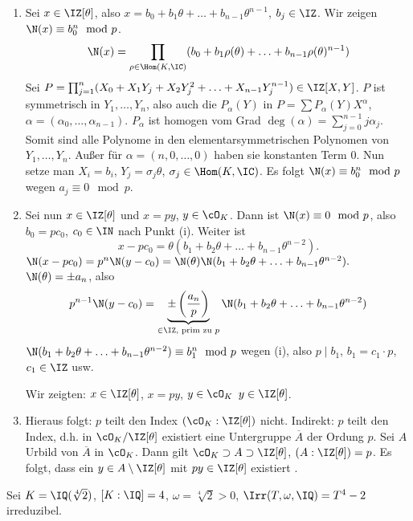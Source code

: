 \begin{Beweis}
 \begin{enumerate}
  \item Sei $x\in\IZ[\theta]$, also $x=b_0+b_1\theta+\ldots+b_{n-1}\theta^{n-1}$, $b_j\in\IZ$. Wir zeigen $\N(x)\equiv b_0^n \mod{p}$.
  \[ \N(x)=\prod_{\rho\in\Hom(K,\IC)} (b_0+b_1\rho(\theta)+\ldots+b_{n-1}\rho(\theta)^{n-1})\]
Sei $P=\prod_{j=1}^n(X_0+X_1Y_j+X_2Y_j^2+\ldots+X_{n-1}Y_j^{n-1})\in\IZ[X,Y]$. $P$ ist symmetrisch in $Y_1,\ldots,Y_n$, also auch die $P_{\alpha}(Y)$ in $P=\sum P_\alpha(Y)X^\alpha$, $\alpha=(\alpha_0,\ldots,\alpha_{n-1})$. $P_\alpha$ ist homogen vom Grad $\deg(\alpha)=\sum_{j=0}^{n-1}j\alpha_j$. Somit sind alle Polynome in den elementarsymmetrischen Polynomen von $Y_1,\ldots,Y_n$. Außer für $\alpha=(n,0,\ldots,0)$ haben sie konstanten Term $0$. Nun setze man $X_i=b_i$, $Y_j=\sigma_j\theta$, $\sigma_j\in\Hom(K,\IC)$. Es folgt $\N(x)\equiv b_0^n \mod{p}$ wegen $a_j\equiv 0\mod{p}$.
\item Sei nun $x\in\IZ[\theta]$ und $x=py$, $y\in\cO_K$. Dann ist $\N(x)\equiv 0\mod{p}$, also $b_0=pc_0$, $c_0\in\IN$ nach Punkt (i). Weiter ist
\[x-pc_0=\theta(b_1+b_2\theta+\ldots+b_{n-1}\theta^{n-2}). \]
\folge $\N(x-pc_0)=p^n\N(y-c_0)=\N(\theta)\N(b_1+b_2\theta+\ldots+b_{n-1}\theta^{n-2}).$ $\N(\theta)=\pm a_n$, also
\[ p^{n-1} \N(y-c_0)=\underbrace{\pm \left( \frac{a_n}{p}\right)}_{\in\IZ,\text{ prim zu } p}\N(b_1+b_2\theta+\ldots+b_{n-1}\theta^{n-2})\]
$\N(b_1+b_2\theta+\ldots+b_{n-1}\theta^{n-2})\equiv b_1^n \mod{p}$ wegen (i), also $p\mid b_1$, $b_1=c_1\cdot p$, $c_1\in\IZ$ usw.

Wir zeigten: $x\in\IZ[\theta]$, $x=py$, $y\in\cO_K$ \folge $y\in\IZ[\theta]$.

\item Hieraus folgt: $p$ teilt den Index $(\cO_K:\IZ[\theta])$ nicht. Indirekt: $p$ teilt den Index, d.h. in $\cO_K/\IZ[\theta]$ existiert eine Untergruppe $\overline A$ der Ordung $p$. Sei $A$ Urbild von $\overline A$ in $\cO_K$. Dann gilt $\cO_K\supset A\supset\IZ[\theta]$, $(A:\IZ[\theta])=p$. Es folgt, dass ein $y\in A\setminus\IZ[\theta]$ mit $py\in\IZ[\theta]$ existiert \lightning.
 \end{enumerate}

Sei $K=\IQ(\sqrt[4]{2})$, $[K:\IQ]=4$, $\omega=\sqrt[4]{2}>0$, $\Irr(T,\omega,\IQ)=T^4-2$ irreduzibel.


\end{Beweis}
